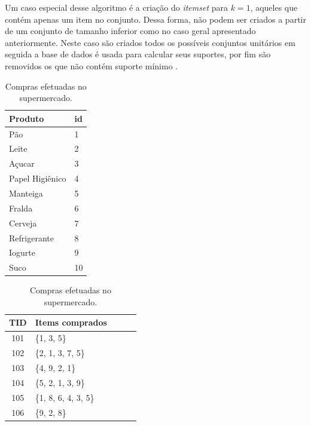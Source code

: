 Um caso especial desse algoritmo é a criação do \emph{itemset} para \(k = 1\), aqueles que contém apenas um item no conjunto. Dessa forma, não podem ser criados a partir de um conjunto de tamanho inferior como no caso geral apresentado anteriormente. Neste caso são criados todos os possíveis conjuntos unitários em seguida a base de dados é usada para calcular seus suportes, por fim são removidos os que não contém suporte mínimo \cite{HanKamber2011}.
\begin{table}[!htbp]
 \caption{Bases de dados disponíveis para o gerente do supermercado.}
   \begin{subtable}{.5\linewidth}
    	\centering
   		\begin{tabular}{ll} \hline 
   		\textbf{Produto} & \textbf{id}	\\ \hline 
   		Pão              & 1	   		\\
   		Leite            & 2			\\
   		Açucar           & 3   			\\
   		Papel Higiênico  & 4   			\\
   		Manteiga         & 5   			\\
   		Fralda           & 6   			\\
   		Cerveja          & 7   			\\
   		Refrigerante     & 8  			\\
   		Iogurte          & 9   			\\
   		Suco	         & 10			\\ \hline
   		\end{tabular}
   		\caption{Produtos da base de dados.}   
   		\label{TABAPRIORI:PRODUTOSMERCADO}		
   \end{subtable}%
   \begin{subtable}{.5\linewidth}
   		\centering
   		\begin{tabular}{cllll} \hline 
   		\textbf{TID} & \textbf{Items comprados}		\\ \hline 
   		101                & \{1, 3, 5\}			\\
   		102                & \{2, 1, 3, 7, 5\}	 	\\
   		103                & \{4, 9, 2, 1\}    		\\
   		104                & \{5, 2, 1, 3, 9\}   	\\
   		105                & \{1, 8, 6, 4, 3, 5\}	\\
   		106                & \{9, 2, 8\}  			\\ \hline
   		\end{tabular}
   		 \caption{Compras efetuadas no supermercado.}
   		 \label{TABAPRIORI:ITEMSETS}
   \end{subtable}
\label{TABAPRIORI}
\vspace{0.1cm}
\end{table}

